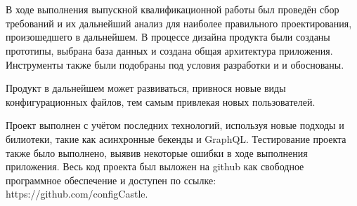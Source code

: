 \section*{}

В ходе выполнения выпускной квалификационной работы был проведён сбор требований и их дальнейший анализ
для наиболее правильного проектирования, произошедшего в дальнейшем.
В процессе дизайна продукта были созданы прототипы, выбрана база данных и создана
общая архитектура приложения. Инструменты также были подобраны под условия разработки и
и обоснованы.

Продукт в дальнейшем может развиваться, привнося новые виды конфигурационных файлов, тем самым привлекая новых пользователей.

Проект выполнен с учётом последних технологий, используя новые подходы и билиотеки, такие как асинхронные бекенды и GraphQL.
Тестирование проекта также было выполнено, выявив некоторые ошибки в ходе выполнения приложения. Весь код проекта был выложен
на github как свободное программное обеспечение и доступен по ссылке: https://github.com/configCastle.